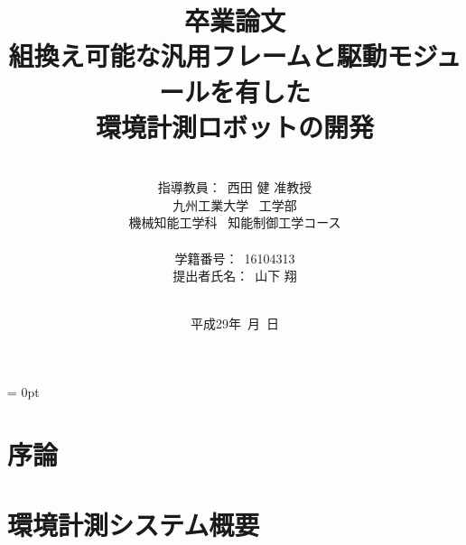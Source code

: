 \documentclass[a4paper,12pt]{ujarticle}
\title{卒業論文\\
組換え可能な汎用フレームと駆動モジュールを有した\\環境計測ロボットの開発\\
}
\author{\vspace{20mm}\\
指導教員：\ 西田 \hspace{0mm} 健 准教授\\
九州工業大学\ \hspace{0mm} 工学部\\
機械知能工学科\ \hspace{0mm} 知能制御工学コース \\
\vspace{0mm}\\
学籍番号：\ 16104313\\
提出者氏名：\ 山下 \hspace{0mm} 翔\\\vspace{5mm}\\ }
\date{平成29年\ 月\ 日}
\begin{document}
\titlepage
\maketitle
\thispagestyle{empty} \newpage
{}
\setcounter{page}{1}
\parindent = 0pt %

\begin{abstract}

\end{abstract}
\thispagestyle{empty}
\newpage
\thispagestyle{empty}
\tableofcontents
\newpage
\section{序論} \label{intro}



\section{環境計測システム概要}
\end{document}
